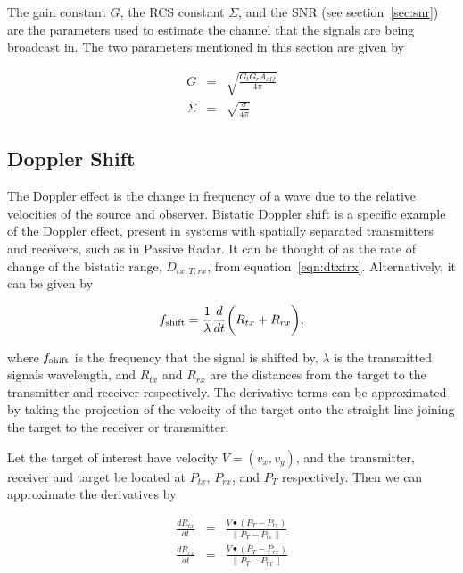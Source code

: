 \documentclass[12pt,openany,a4paper]{book}
\begin{document}
\bigskip

The gain constant $G$, the RCS constant $\Sigma$, and the SNR (see section~\ref{sec:snr}) are the parameters used to estimate the channel that the signals are being broadcast in. The two parameters mentioned in this section are given by

\begin{eqnarray}
G &=& \sqrt{\frac{G_tG_r A_{eff}}{4\pi}}\\
\Sigma &=& \sqrt{\frac{\sigma}{4\pi}}
\end{eqnarray} 

\subsection{Doppler Shift}
\label{sec:doppler}
The Doppler effect is the change in frequency of a wave due to the relative velocities of the source and observer. Bistatic Doppler shift is a specific example of the Doppler effect, present in systems with spatially separated transmitters and receivers, such as in Passive Radar. It can be thought of as the rate of change of the bistatic range, $D_{tx\colon T\colon rx}$, from equation~\ref{eqn:dtxtrx}. Alternatively, it can be given by

\begin{equation}
f_{\textnormal{shift}} = \frac{1}{\lambda} \frac{d}{dt}\bigg( R_{tx} + R_{rx} \bigg),
\end{equation}

\bigskip

where $f_{\textnormal{shift}}$ is the frequency that the signal is shifted by, $\lambda$ is the transmitted signals wavelength, and $R_{tx}$ and $R_{rx}$ are the distances from the target to the transmitter and receiver respectively. The derivative terms can be approximated by taking the projection of the velocity of the target onto the straight line joining the target to the receiver or transmitter.

\bigskip

Let the target of interest have velocity $V = (v_x,v_y)$, and the transmitter, receiver and target be located at $P_{tx}$, $P_{rx}$, and $P_T$ respectively. Then we can approximate the derivatives by

\begin{eqnarray}
\frac{dR_{tx}}{dt} &=& \frac{V\bullet(P_T - P_{tx})}{\|P_T - P_{tx}\|} \\
\frac{dR_{rx}}{dt} &=& \frac{V\bullet(P_T - P_{rx})}{\|P_T - P_{rx}\|}
\end{eqnarray}
\end{document}
